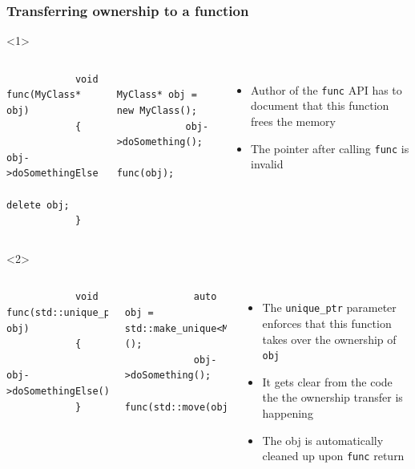\documentclass{beamer}
\begin{document}
\begin{frame}[fragile,t]
\frametitle{Transferring ownership to a function}
	\begin{onlyenv}
	\begin{columns}[T]
		\begin{lstlisting}
			void func(MyClass* obj)
			{
				obj->doSomethingElse();
				delete obj;
			}
		\end{lstlisting}
        \hrulefill
		\begin{lstlisting}
			MyClass* obj = new MyClass();
			obj->doSomething();
			func(obj);			
		\end{lstlisting}
		\begin{itemize}
			\item Author of the \texttt{func} API has to document that this function
				  frees the memory
			\item The pointer after calling \texttt{func} is invalid
		\end{itemize}
		
	\end{columns}
	\end{onlyenv}
	
	\begin{onlyenv}
	\begin{columns}[T]
		\begin{lstlisting}
			void func(std::unique_ptr<MyClass> obj)
			{
				obj->doSomethingElse();		
			}
		\end{lstlisting}
        \hrulefill
		\begin{lstlisting}
			auto obj = std::make_unique<MyClass>();
			obj->doSomething();
			func(std::move(obj));		
		\end{lstlisting}
		\begin{itemize}
			\item The \texttt{unique\_ptr} parameter enforces that this function takes
				  over the ownership of \texttt{obj}
			\item It gets clear from the code the the ownership transfer is happening
			\item The obj is automatically cleaned up upon \texttt{func} return
		\end{itemize}
	\end{columns}
	\end{onlyenv}
\end{frame}
\end{document}
